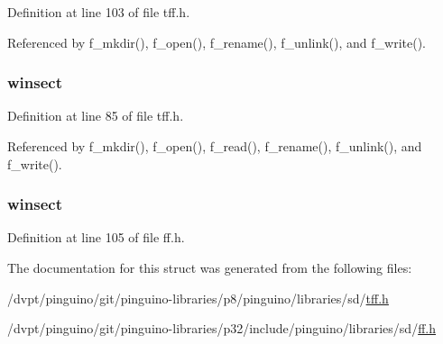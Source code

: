 Definition at line 103 of file tff.\-h.



Referenced by f\-\_\-mkdir(), f\-\_\-open(), f\-\_\-rename(), f\-\_\-unlink(), and f\-\_\-write().

\hypertarget{struct_f_a_t_f_s_a5ee19a26d1dfd79d52fbba59cc792da3}{
\subsubsection[{winsect}]{ winsect}}\label{struct_f_a_t_f_s_a5ee19a26d1dfd79d52fbba59cc792da3}


Definition at line 85 of file tff.\-h.



Referenced by f\-\_\-mkdir(), f\-\_\-open(), f\-\_\-read(), f\-\_\-rename(), f\-\_\-unlink(), and f\-\_\-write().

\hypertarget{struct_f_a_t_f_s_a285dc1de6874bb5f0c41c328c9433e14}{
\subsubsection[{winsect}]{ winsect}}\label{struct_f_a_t_f_s_a285dc1de6874bb5f0c41c328c9433e14}


Definition at line 105 of file ff.\-h.



The documentation for this struct was generated from the following files\-:\begin{DoxyCompactItemize}
\item 
/dvpt/pinguino/git/pinguino-\/libraries/p8/pinguino/libraries/sd/\hyperlink{tff_8h}{tff.\-h}\item 
/dvpt/pinguino/git/pinguino-\/libraries/p32/include/pinguino/libraries/sd/\hyperlink{ff_8h}{ff.\-h}\end{DoxyCompactItemize}
